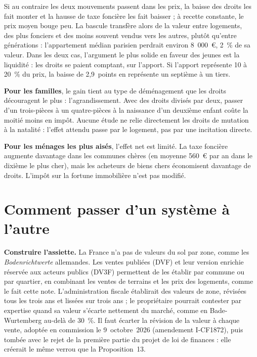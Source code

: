 \documentclass[11pt,a4paper]{article}
\begin{document}
Si au contraire les deux mouvements passent dans les prix, la baisse des droits les fait monter et la hausse
de taxe foncière les fait baisser ; à recette constante, le prix moyen bouge peu. La bascule transfère alors
de la valeur entre logements, des plus fonciers et des moins souvent vendus vers les autres, plutôt qu'entre
générations : l'appartement médian parisien perdrait environ 8~000~€, 2~\% de sa valeur. Dans les deux cas,
l'argument le plus solide en faveur des jeunes est la liquidité : les droits se paient comptant, sur
l'apport. Si l'apport représente 10 à 20~\% du prix, la baisse de 2,9~points en représente un septième à un
tiers.

\textbf{Pour les familles}, le gain tient au type de déménagement que les droits découragent le plus :
l'agrandissement. Avec des droits divisés par deux, passer d'un trois-pièces à un quatre-pièces à la
naissance d'un deuxième enfant coûte la moitié moins en impôt. Aucune étude
ne relie directement les droits de mutation à la natalité : l'effet attendu passe par le logement, pas par
une incitation directe.

\textbf{Pour les ménages les plus aisés}, l'effet net est limité. La taxe foncière augmente davantage dans
les communes chères (en moyenne 560~€ par an dans le dixième le plus cher), mais
les acheteurs de biens chers économisent davantage de droits. L'impôt sur la fortune immobilière n'est pas
modifié.

\section{Comment passer d'un système à l'autre}

\textbf{Construire l'assiette.} La France n'a pas de valeurs du sol par zone, comme les
\emph{Bodenrichtwerte} allemandes. Les ventes publiées (DVF) et leur version enrichie réservée aux acteurs
publics (DV3F) permettent de les établir par commune ou par quartier, en combinant les ventes de terrains et
les prix des logements, comme le fait cette note. L'administration fiscale établirait des valeurs de zone,
révisées tous les trois ans et lissées sur trois ans ; le propriétaire pourrait contester par expertise
quand sa valeur s'écarte nettement du marché, comme en Bade-Wurtemberg au-delà de 30~\%. Il faut écarter
la révision de la valeur à chaque vente, adoptée en commission le 9~octobre~2026 (amendement I-CF1872), puis
tombée avec le rejet de la première partie du projet de loi de finances : elle créerait le même verrou que la Proposition~13.
\end{document}
